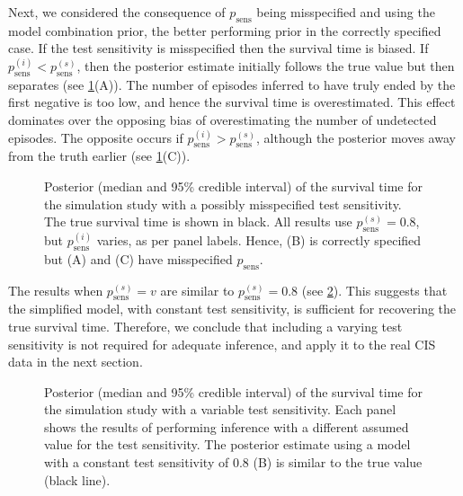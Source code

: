 \documentclass[12pt]{article}
\newcommand{\psens}{p_\text{sens}}
\newcommand{\psenss}{p_\text{sens}^{(s)}}
\newcommand{\psensi}{p_\text{sens}^{(i)}}
\begin{document}
Next, we considered the consequence of $\psens$ being misspecified and using the model combination prior, the better performing prior in the correctly specified case.
If the test sensitivity is misspecified then the survival time is biased.
If $\psensi < \psenss$, then the posterior estimate initially follows the true value but then separates (see \cref{imperf-test:fig:misspecified-test-sensitivity}(A)).
The number of episodes inferred to have truly ended by the first negative is too low, and hence the survival time is overestimated.
This effect dominates over the opposing bias of overestimating the number of undetected episodes.
The opposite occurs if $\psensi > \psenss$, although the posterior moves away from the truth earlier (see \cref{imperf-test:fig:misspecified-test-sensitivity}(C)).
\begin{figure}
  \caption[Simulation study results with misspecified test sensitivity]{%
    Posterior (median and 95\% credible interval) of the survival time for the simulation study with a possibly misspecified test sensitivity.
    The true survival time is shown in black.
    All results use $\psenss = 0.8$, but $\psensi$ varies, as per panel labels.
    Hence, (B) is correctly specified but (A) and (C) have misspecified $\psens$.
  }
  \label{imperf-test:fig:misspecified-test-sensitivity}
\end{figure}

The results when $\psenss = v$ are similar to $\psenss = 0.8$ (see \cref{imperf-test:fig:variable-test-sensitivity}).
This suggests that the simplified model, with constant test sensitivity, is sufficient for recovering the true survival time.
Therefore, we conclude that including a varying test sensitivity is not required for adequate inference, and apply it to the real CIS data in the next section.
\begin{figure}
  \caption[Simulation study results with varying test sensitivity]{%
    Posterior (median and 95\% credible interval) of the survival time for the simulation study with a variable test sensitivity.
    Each panel shows the results of performing inference with a different assumed value for the test sensitivity.
    The posterior estimate using a model with a constant test sensitivity of 0.8 (B) is similar to the true value (black line).
  }
  \label{imperf-test:fig:variable-test-sensitivity}
\end{figure}
\end{document}
